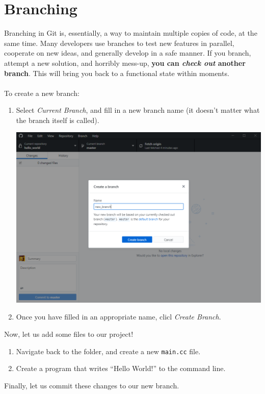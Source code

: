 \documentclass[12pt, letter]{article}
\begin{document}
    \section{Branching}
    Branching in Git is, essentially, a way to maintain multiple copies of code, at the same time. Many developers use branches to test new features in parallel, cooperate on new ideas, and generally develop in a safe manner. If you branch, attempt a new solution, and horribly mess-up, \textbf{you can \emph{check out} another branch}. This will bring you back to a functional state within moments.
    \\ \\
    To create a new branch:
    \begin{enumerate}
        \item Select \emph{Current Branch}, and fill in a new branch name (it doesn't matter what the branch itself is called).

        \includegraphics{screenshots/shot7.bmp}

        \item Once you have filled in an appropriate name, clicl \emph{Create Branch}.
    \end{enumerate}
    Now, let us add some files to our project!
    \begin{enumerate}
        \item Navigate back to the folder, and create a new \verb|main.cc| file.

        \item Create a program that writes ``Hello World!'' to the command line.
    \end{enumerate}
    Finally, let us commit these changes to our new branch.
\end{document}
